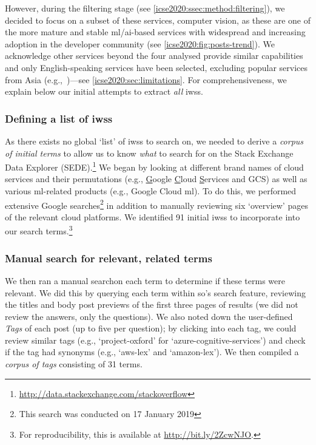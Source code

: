 However, during the filtering stage (see \cref{icse2020:ssec:method:filtering}), we decided to focus on a subset of these services, computer vision, as these are one of the more mature and stable \gls{ml}/\gls{ai}-based services with widespread and increasing adoption in the developer community (see \cref{icse2020:fig:posts-trend}). We acknowledge other services beyond the four analysed provide similar capabilities~ and only English-speaking services have been selected, excluding popular services from Asia (e.g.,~)---see \cref{icse2020:sec:limitations}. For comprehensiveness, we explain below our initial attempts to extract \textit{all} \glspl{iws}. %

\subsubsection[Defining a list of IWSs]{Defining a list of \glspl{iws}}\label{icse2020:list-of-iwss}
As there exists no global `list' of \glspl{iws} to search on, we needed to derive a \textit{corpus of initial terms} to allow us to know \textit{what} to search for on the Stack Exchange Data Explorer (SEDE).\footnote{\url{http://data.stackexchange.com/stackoverflow}} We began by looking at different brand names of cloud services and their permutations (e.g., \uline{G}oogle \uline{C}loud \uline{S}ervices and GCS) as well as various \gls{ml}-related products (e.g., Google Cloud \gls{ml}). To do this, we performed extensive Google searches\footnote{This search was conducted on 17 January 2019}\def\footnotesearchdate{2} in addition to manually reviewing six `overview' pages of the relevant cloud platforms. We identified 91 initial \glspl{iws} to incorporate into our search terms.\footnote{For reproducibility, this is available at \url{http://bit.ly/2ZcwNJO}.}\def\footnotereproducability{3}

\subsubsection{Manual search for relevant, related terms}
We then ran a manual search\footnotemark[\footnotesearchdate{}] %
on each term to determine if these terms were relevant. We did this by querying each term within \gls{so}'s search feature, reviewing the titles and body post previews of the first three pages of results (we did not review the answers, only the questions). We also noted down the user-defined \textit{Tags} of each post (up to five per question); by clicking into each tag, we could review similar tags (e.g., `project-oxford' for `azure-cognitive-services') and check if the tag had synonyms (e.g., `aws-lex' and `amazon-lex'). We then compiled a \textit{corpus of tags} consisting of 31 terms.

